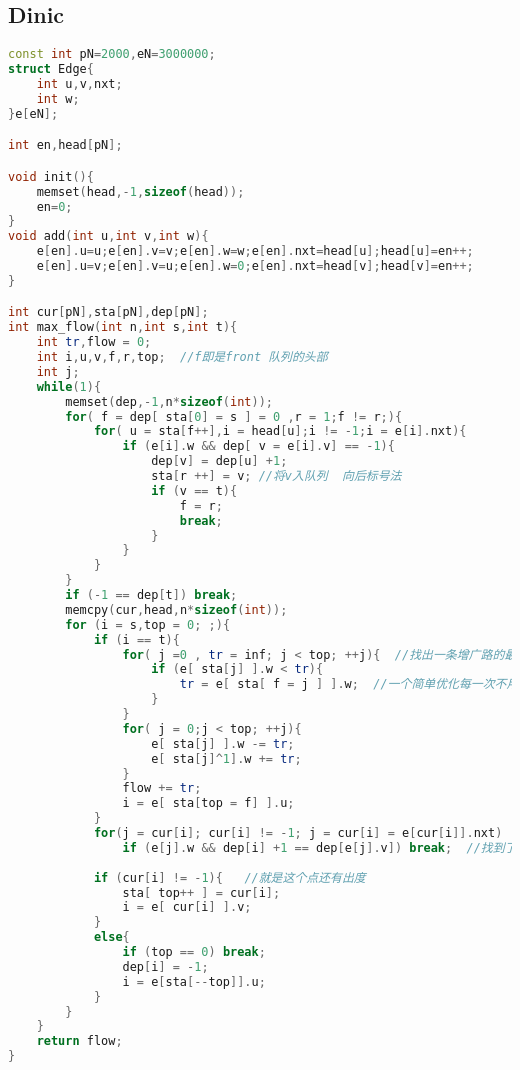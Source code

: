\subsection{Dinic}
		\begin{lstlisting}[language=c++]
const int pN=2000,eN=3000000;
struct Edge{
	int u,v,nxt;
	int w;
}e[eN];

int en,head[pN];

void init(){
	memset(head,-1,sizeof(head));
	en=0;
}	
void add(int u,int v,int w){
	e[en].u=u;e[en].v=v;e[en].w=w;e[en].nxt=head[u];head[u]=en++;
	e[en].u=v;e[en].v=u;e[en].w=0;e[en].nxt=head[v];head[v]=en++;
}

int cur[pN],sta[pN],dep[pN];     
int max_flow(int n,int s,int t){   
	int tr,flow = 0;
	int i,u,v,f,r,top;  //f即是front 队列的头部
	int j;
	while(1){
		memset(dep,-1,n*sizeof(int));
		for( f = dep[ sta[0] = s ] = 0 ,r = 1;f != r;){
			for( u = sta[f++],i = head[u];i != -1;i = e[i].nxt){
				if (e[i].w && dep[ v = e[i].v] == -1){
					dep[v] = dep[u] +1;
					sta[r ++] = v; //将v入队列  向后标号法
					if (v == t){
						f = r;
						break;
					}
				}	
			}
		}
		if (-1 == dep[t]) break;
		memcpy(cur,head,n*sizeof(int));
		for (i = s,top = 0; ;){
			if (i == t){
				for( j =0 , tr = inf; j < top; ++j){  //找出一条增广路的最小边权
					if (e[ sta[j] ].w < tr){
						tr = e[ sta[ f = j ] ].w;  //一个简单优化每一次不用从头开始找增广
					}
				}
				for( j = 0;j < top; ++j){
					e[ sta[j] ].w -= tr;
					e[ sta[j]^1].w += tr;
				}
				flow += tr;
				i = e[ sta[top = f] ].u;
			}
			for(j = cur[i]; cur[i] != -1; j = cur[i] = e[cur[i]].nxt)  //i为当前的栈顶元素
				if (e[j].w && dep[i] +1 == dep[e[j].v]) break;  //找到了一条路径最短的增广边
			
			if (cur[i] != -1){   //就是这个点还有出度
				sta[ top++ ] = cur[i];
				i = e[ cur[i] ].v;
			}
			else{
				if (top == 0) break;   
				dep[i] = -1;           
				i = e[sta[--top]].u;  
			}
		}	
	}
	return flow;
}
	\end{lstlisting}